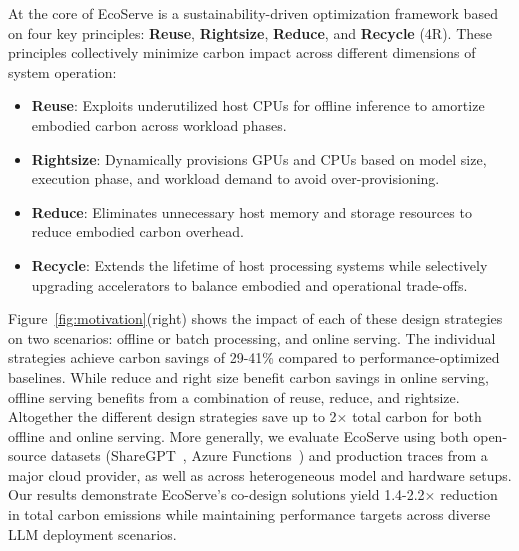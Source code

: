At the core of EcoServe is a sustainability-driven optimization framework based on four key principles: \textbf{Reuse}, \textbf{Rightsize}, \textbf{Reduce}, and \textbf{Recycle} (4R). These principles collectively minimize carbon impact across different dimensions of system operation:
\begin{itemize}
    \item \textbf{Reuse}: Exploits underutilized host CPUs for offline inference to amortize embodied carbon across workload phases.
    \item \textbf{Rightsize}: Dynamically provisions GPUs and CPUs based on model size, execution phase, and workload demand to avoid over-provisioning.
    \item \textbf{Reduce}: Eliminates unnecessary host memory and storage resources to reduce embodied carbon overhead.
    \item \textbf{Recycle}: Extends the lifetime of host processing systems while selectively upgrading accelerators to balance embodied and operational trade-offs.
\end{itemize}

Figure~\ref{fig:motivation}(right) shows the impact of each of these design strategies on two scenarios: offline or batch processing, and online serving.
The individual strategies achieve carbon savings of 29-41\% compared to performance-optimized baselines.
While reduce and right size benefit carbon savings in online serving, offline serving benefits from a combination of reuse, reduce, and rightsize.
Altogether the different design strategies save up to 2$\times$ total carbon for both offline and online serving.
More generally, we evaluate EcoServe using both open-source datasets (ShareGPT~\cite{sharegpt}, Azure Functions~\cite{patel2023splitwise}) and production traces from a major cloud provider, as well as across heterogeneous model and hardware setups.
Our results demonstrate EcoServe's co-design solutions yield 1.4-2.2$\times$ reduction in total carbon emissions while maintaining performance targets across diverse LLM deployment scenarios. 

